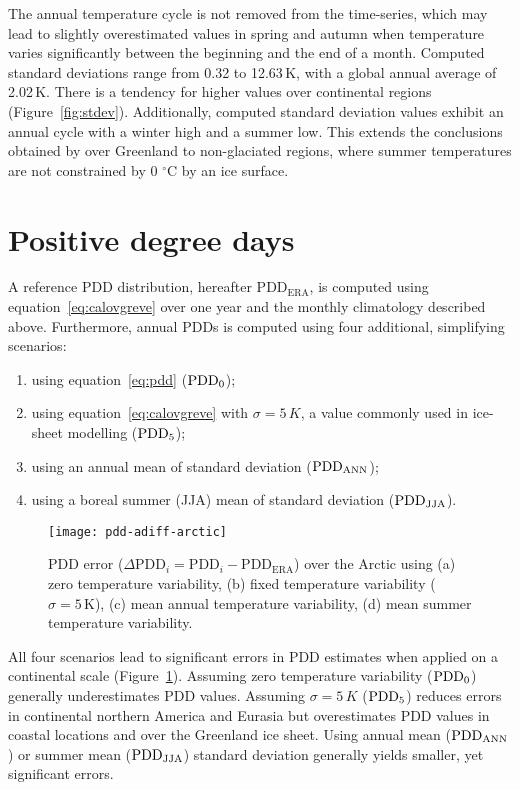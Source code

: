 \documentclass[review]{igs}
\begin{document}
The annual temperature cycle is not removed from the time-series, which may lead to slightly overestimated values in spring and autumn when temperature varies significantly between the beginning and the end of a month. Computed standard deviations range from 0.32 to 12.63\,K, with a global annual average of 2.02\,K. There is a tendency for higher values over continental regions (Figure~\ref{fig:stdev}). Additionally, computed standard deviation values exhibit an annual cycle with a winter high and a summer low. This extends the conclusions obtained by \citet{fausto-etal-2011} over Greenland to non-glaciated regions, where summer temperatures are not constrained by 0 $^\circ$C by an ice surface.


\section{Positive degree days}

A reference PDD distribution, hereafter $\mathrm{PDD_{ERA}}$, is computed using equation~\ref{eq:calovgreve} over one year and the monthly climatology described above. Furthermore, annual PDDs is computed using four additional, simplifying scenarios:

\begin{enumerate}
  \item using equation~\ref{eq:pdd} ($\rm PDD_0$);
  \item using equation~\ref{eq:calovgreve} with $\sigma=5\,K$, a value commonly used in ice-sheet modelling \citep{huybrechts-dewolde-1999,seddik-etal-2012,charbit-etal-2013} ($\rm PDD_5$);
  \item using an annual mean of standard deviation ($\rm PDD_{ANN}$);
  \item using a boreal summer (JJA) mean of standard deviation ($\rm PDD_{JJA}$).
\end{enumerate}

\begin{figure}
  \centering\texttt{[image: pdd-adiff-arctic]}
  \caption{PDD error ($\Delta\mathrm{PDD}_i = \mathrm{PDD}_i - \mathrm{PDD_{ERA}}$) over the Arctic using (a) zero temperature variability, (b) fixed temperature variability ($\sigma=5\,\mathrm{K}$), (c) mean annual temperature variability, (d) mean summer temperature variability.}
  \label{fig:pdd}
\end{figure}

All four scenarios lead to significant errors in PDD estimates when applied on a continental scale (Figure~\ref{fig:pdd}). Assuming zero temperature variability ($\rm PDD_0$) generally underestimates PDD values. Assuming $\sigma=5\,K$ ($\rm PDD_5$) reduces errors in continental northern America and Eurasia but overestimates PDD values in coastal locations and over the Greenland ice sheet. Using annual mean ($\rm PDD_{ANN}$) or summer mean ($\rm PDD_{JJA}$) standard deviation generally yields smaller, yet significant errors.
\end{document}

